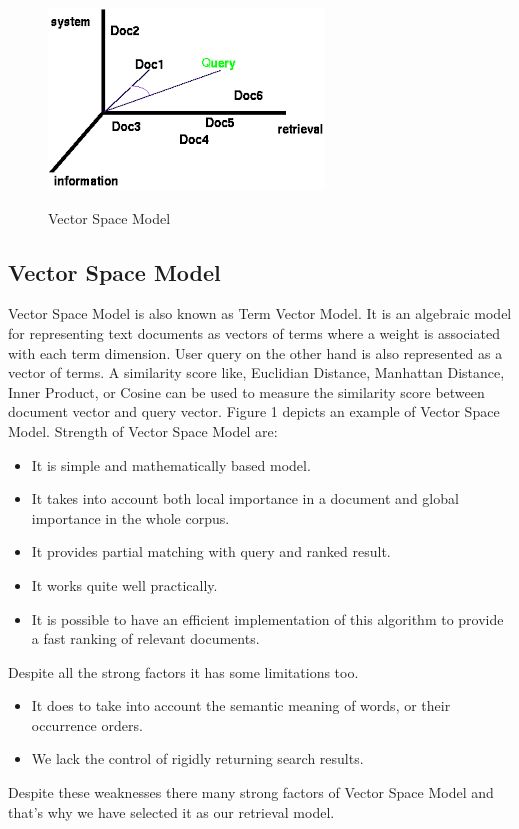 \begin{figure}
\center
\includegraphics[width=0.5\linewidth]{figures/vsm}
\label{fig:vsm}
\caption{Vector Space Model}
\end{figure}

\subsection{Vector Space Model}
\label{sec:vsm-desc}
Vector Space Model \cite{vector-space-model} is also known as Term Vector Model. It is an algebraic model for
representing text documents as vectors of terms where a weight is associated with each term
dimension. User query on the other hand is also represented as a vector of terms. A similarity
score like, Euclidian Distance, Manhattan Distance, Inner Product, or Cosine can be used to
measure the similarity score between document vector and query vector. Figure 1 depicts an
example of Vector Space Model. Strength of Vector Space Model are:

\begin{itemize}
\item It is simple and mathematically based model.
\item It takes into account both local importance in a document and global importance in the whole corpus.
\item It provides partial matching with query and ranked result.
\item It works quite well practically.
\item It is possible to have an efficient implementation of this algorithm to provide a fast ranking of relevant documents.
\end{itemize}
Despite all the strong factors it has some limitations too.
\begin{itemize}
\item It does to take into account the
semantic meaning of words, or their occurrence orders.
\item We lack the control of rigidly returning search results.
\end{itemize}
Despite these weaknesses there many strong factors of Vector Space Model and that’s why we have selected it as our retrieval model.

